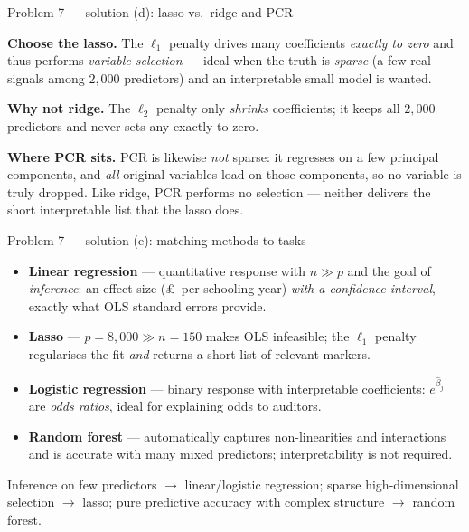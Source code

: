 \documentclass[aspectratio=169,11pt]{beamer}
\begin{document}
\begin{frame}{Problem 7 --- solution (d): lasso vs.\ ridge and PCR}
  \begin{solutionbox}
    \textbf{Choose the lasso.} The $\ell_1$ penalty drives many coefficients \emph{exactly to zero}
    and thus performs \emph{variable selection} --- ideal when the truth is \emph{sparse} (a few
    real signals among $2{,}000$ predictors) and an interpretable small model is wanted.
    \medskip

    \textbf{Why not ridge.} The $\ell_2$ penalty only \emph{shrinks} coefficients; it keeps all
    $2{,}000$ predictors and never sets any exactly to zero.
    \medskip

    \textbf{Where PCR sits.} PCR is likewise \emph{not} sparse: it regresses on a few principal
    components, and \emph{all} original variables load on those components, so no variable is truly
    dropped. Like ridge, PCR performs no selection --- neither delivers the short interpretable list
    that the lasso does.
  \end{solutionbox}
\end{frame}

\begin{frame}{Problem 7 --- solution (e): matching methods to tasks}
  \begin{solutionbox}
    \begin{itemize}
      \item[(i)] \textbf{Linear regression} --- quantitative response with $n\gg p$ and the goal of
        \emph{inference}: an effect size (\pounds\ per schooling-year) \emph{with a confidence
        interval}, exactly what OLS standard errors provide.
      \item[(ii)] \textbf{Lasso} --- $p=8{,}000\gg n=150$ makes OLS infeasible; the $\ell_1$ penalty
        regularises the fit \emph{and} returns a short list of relevant markers.
      \item[(iii)] \textbf{Logistic regression} --- binary response with interpretable coefficients:
        $e^{\hat\beta_j}$ are \emph{odds ratios}, ideal for explaining odds to auditors.
      \item[(iv)] \textbf{Random forest} --- automatically captures non-linearities and interactions
        and is accurate with many mixed predictors; interpretability is not required.
    \end{itemize}
    \begin{takeaway}
      Inference on few predictors $\to$ linear/logistic regression; sparse high-dimensional selection
      $\to$ lasso; pure predictive accuracy with complex structure $\to$ random forest.
    \end{takeaway}
  \end{solutionbox}
\end{frame}
\end{document}
